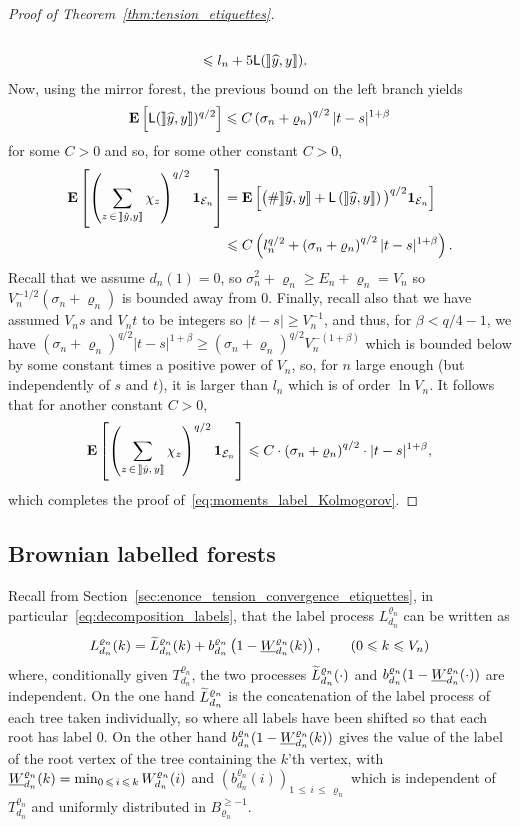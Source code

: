 \documentclass[10pt]{amsart}
\theoremstyle{definition}\newtheorem{defi}[theo]{Definition}\newtheorem{rema}[theo]{Remark}\newtheorem{exam}[theo]{Example}\newtheorem{exem}[theo]{Example}\newtheorem{nota}[theo]{Notation}
\newcommand{\rrbracket}{\mathclose{]\mkern -2.7mu]}}
\newcommand{\ensembles}[1]{\mathbf{#1}}
\newcommand{\E}{\ensembles{E}}
\newcommand{\Es}[1]{\E\left[#1\right]}
\newcommand{\1}{\ensembles{1}}
\newcommand{\tildep}[1]{\widetilde{#1}\vphantom{#1}}
\newcommand{\underlinep}[1]{\underline{#1}\vphantom{#1}}
\renewcommand{\le}{\leqslant}
\renewcommand{\ge}{\geqslant}
\newcommand{\LL}{\mathsf{L}}
\newcommand{\BBmap}{B}
\newcommand{\clE}{\mathcal{E}}
\newcommand{\fn}{T_{d_n}^{\varrho_n}}
\newcommand{\Wfn}{W_{d_n}^{\varrho_n}}
\newcommand{\Lfn}{L_{d_n}^{\varrho_n}}
\newcommand{\tLfn}{\tildep{L}_{d_n}^{\varrho_n}}
\newcommand{\bfn}{b_{d_n}^{\varrho_n}}
\newcommand{\infWfn}{\underlinep{W}_{d_n}^{\varrho_n}}
\newcommand{\edges}{E}
\newcommand{\vertices}{V}
\let\oldhat\hat
\renewcommand*{\hat}[1]{\mathchoice{\widehat{#1}}{\widehat{#1}}{\oldhat{#1}}{\oldhat{#1}}}
\providecommand{\?}{}
\begin{document}
\begin{proof}[Proof of Theorem~\ref{thm:tension_etiquettes}]
\begin{align*}
\\
&\le l_n + 5 \LL(\mathopen{\rrbracket} \hat{y}, y \mathclose{\rrbracket}).
\end{align*}
Now, using the mirror forest, the previous bound on the left branch yields
\[
\E\left[\LL(\mathopen{\rrbracket} \hat{y}, y \mathclose{\rrbracket})^{q/2}\right] \le C \left(\sigma_n + \varrho_n\right)^{q/2} |t-s|^{1+\beta}
\]
for some $C>0$ and so, for some other constant $C > 0$,
\begin{align*}
\Es{\left(\sum_{z\,\in\,\mathopen{\rrbracket} \hat{y},\?y \mathclose{\rrbracket}} \chi_{z}\right)^{q/2} \1_{\clE_n}} &= \Es{\big(\# \mathopen{\rrbracket} \hat{y}, y \mathclose{\rrbracket} + \LL\left(\mathopen{\rrbracket} \hat{y}, y \mathclose{\rrbracket}\right)\big)^{q/2} \1_{\clE_n}}
\\
&\le C \left(l_n^{q/2} + \left(\sigma_n + \varrho_n\right)^{q/2} |t-s|^{1+\beta}\right).
\end{align*}
Recall that we assume $d_{n}(1) = 0$, so $\sigma_{n}^{2} + \varrho_{n} \ge \edges_{n}+ \varrho_{n} = \vertices_{n}$ so $\vertices_n^{-1/2} (\sigma_n + \varrho_n)$ is bounded away from $0$. Finally, recall also that we have assumed $\vertices_n s$ and $\vertices_n t$ to be integers so $|t-s| \ge \vertices_n^{-1}$, and thus, for $\beta < q/4-1$, we have $(\sigma_n + \varrho_n)^{q/2} |t - s|^{1+\beta} \ge (\sigma_n + \varrho_n)^{q/2} \vertices_n^{-(1+\beta)}$ which is bounded below by some constant times a positive power of $\vertices_n$, so, for $n$ large enough (but independently of $s$ and $t$), it is larger than $l_n$ which is of order $\ln \vertices_n$. It follows that for another constant $C > 0$,
\[
\Es{\left(\sum_{z\,\in\,\mathopen{\rrbracket} \hat{y},\,y \mathclose{\rrbracket}} \chi_{z}\right)^{q/2} \1_{\clE_n}}
\le C \cdot \left(\sigma_n + \varrho_n\right)^{q/2} \cdot |t - s|^{1+\beta},
\]
which completes the proof of~\eqref{eq:moments_label_Kolmogorov}.
\end{proof}



\subsection{Brownian labelled forests}\label{sec:serpent_brownien}

Recall from Section~\ref{sec:enonce_tension_convergence_etiquettes}, in particular~\eqref{eq:decomposition_labels}, that the label process $\Lfn$ can be written as
\[
\Lfn(k) = \tLfn(k) + \bfn\left(1-\infWfn(k)\right),
\qquad (0\le k \le V_n)
\]
where, conditionally given $\fn$, the two processes $\tLfn(\cdot)$ and $\bfn(1-\infWfn(\cdot))$ are independent. On the one hand $\tLfn$ is the concatenation of the label process of each tree taken individually, so where all labels have been shifted so that each root has label $0$. On the other hand $\bfn(1-\infWfn(k))$ gives the value of the label of the root vertex of the tree containing the $k$'th vertex, with $\infWfn(k) = \min_{0\,\le\,i\,\le\,k} \Wfn(i)$ and $(\bfn(i))_{1\,\le\,i\,\le\,\varrho_n}$ which is independent of $\fn$ and uniformly distributed in $\BBmap_{\varrho_n}^{\ge -1}$.
\end{document}
